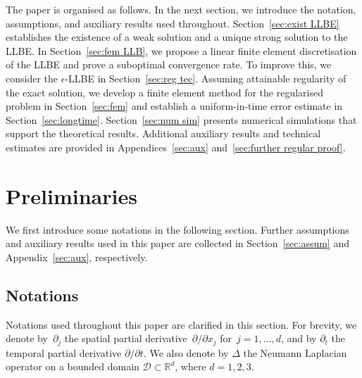 \documentclass[11pt,reqno]{amsart}
\theoremstyle{definition}
\numberwithin{equation}{section}
\newcommand{\bb}{\mathbb}
\newcommand{\pa}{\partial}
\begin{document}
The paper is organised as follows. In the next section, we introduce the notation, assumptions, and auxiliary results used throughout. Section~\ref{sec:exist LLBE} establishes the existence of a weak solution and a unique strong solution to the LLBE. In Section~\ref{sec:fem LLB}, we propose a linear finite element discretisation of the LLBE and prove a suboptimal convergence rate. To improve this, we consider the $\epsilon$-LLBE in Section~\ref{sec:reg tec}. Assuming attainable regularity of the exact solution, we develop a finite element method for the regularised problem in Section~\ref{sec:fem} and establish a uniform-in-time error estimate in Section~\ref{sec:longtime}. Section~\ref{sec:num sim} presents numerical simulations that support the theoretical results. Additional auxiliary results and technical estimates are provided in Appendices~\ref{sec:aux} and~\ref{sec:further regular proof}.





\section{Preliminaries}

We first introduce some notations in the following section. Further assumptions and auxiliary results used in this paper are collected in Section~\ref{sec:assum} and Appendix~\ref{sec:aux}, respectively.

\subsection{Notations}\label{sec:notation}


Notations used throughout this paper are clarified in this section. For brevity, we denote by~$\pa_j$ the spatial partial derivative~$\pa/\pa
x_j$ for~$j=1,\ldots,d$, and by $\partial_t$ the temporal partial derivative $\partial /\partial t$. We also denote by $\Delta$ the Neumann Laplacian operator on a bounded domain $\mathscr{D}\subset \bb{R}^d$, where $d=1,2,3$.
\end{document}
